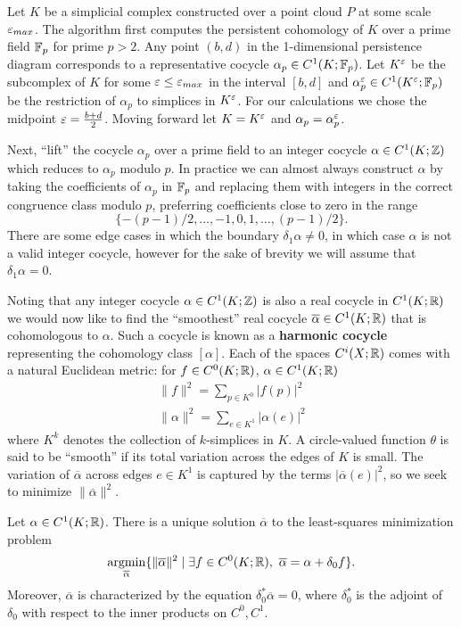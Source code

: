 Let $K$ be a simplicial complex constructed over a point cloud $P$ at some scale $\varepsilon_{max}$.
The algorithm first computes the persistent cohomology of $K$ over a prime field $\mathbb{F}_p$ for prime $p > 2$.
Any point $(b, d)$ in the 1-dimensional persistence diagram corresponds to a representative cocycle $\alpha_p\in C^1(K;\mathbb{F}_p)$.
Let $K^\varepsilon$ be the subcomplex of $K$ for some $\varepsilon\leq \varepsilon_{max}$ in the interval $[b, d]$ and $\alpha^\varepsilon_p\in C^1(K^\varepsilon;\mathbb{F}_p)$ be the restriction of $\alpha_p$ to simplices in $K^\varepsilon$.
For our calculations we chose the midpoint $\varepsilon = \frac{b+d}{2}$.
Moving forward let $K = K^\varepsilon$ and $\alpha_p = \alpha^\varepsilon_p$.

Next, ``lift'' the cocycle $\alpha_p$ over a prime field to an integer cocycle $\alpha\in C^1(K;\mathbb{Z})$ which reduces to $\alpha_p$ modulo $p$.
In practice we can almost always construct $\alpha$ by taking the coefficients of $\alpha_p$ in $\mathbb{F}_p$ and replacing them with integers in the correct congruence class modulo $p$, preferring coefficients close to zero in the range
\[ \{-(p-1)/2,\ldots,-1,0,1,\ldots,(p-1)/2\}. \]
There are some edge cases in which the boundary $\delta_1\alpha\neq 0$, in which case $\alpha$ is not a valid integer cocycle, however for the sake of brevity we will assume that $\delta_1\alpha = 0$.

Noting that any integer cocycle $\alpha\in C^1(K;\mathbb{Z})$ is also a real cocycle in $C^1(K;\mathbb{R})$ we would now like to find the ``smoothest'' real cocycle $\overline{\alpha}\in C^1(K;\mathbb{R})$ that is cohomologous to $\alpha$.
Such a cocycle is known as a \textbf{harmonic cocycle} representing the cohomology class $[\alpha]$.
Each of the spaces $C^i(X;\mathbb{R})$ comes with a natural Euclidean metric: for $f\in C^0(K;\mathbb{R})$, $\alpha\in C^1(K;\mathbb{R})$ %
\begin{align*}
    \|f\|^2 = \sum_{p\in K^0} |f(p)|^2\\
    \|\alpha\|^2 = \sum_{e\in K^1} |\alpha(e)|^2 %
\end{align*}
where $K^k$ denotes the collection of $k$-simplices in $K$.
A circle-valued function $\theta$ is said to be ``smooth'' if its total variation across the edges of $K$ is small.
The variation of $\overline{\alpha}$ across edges $e\in K^1$ is captured by the terms $|\overline{\alpha}(e)|^2$, so we seek to minimize $\|\overline{\alpha}\|^2$.

\begin{proposition}
    Let $\alpha\in C^1(K; \mathbb{R})$.
    There is a unique solution $\overline{\alpha}$ to the least-squares minimization problem
    \[ \operatorname*{argmin}_{\overline{\alpha}} \{\|\overline{\alpha}\|^2\mid \exists f\in C^0(K;\mathbb{R}),\ \overline{\alpha} = \alpha + \delta_0 f\}.\]
    Moreover, $\overline{\alpha}$ is characterized by the equation $\delta_0^*\overline{\alpha} = 0$, where $\delta_0^*$ is the adjoint of $\delta_0$ with respect to the inner products on $C^0, C^1$.
\end{proposition}


